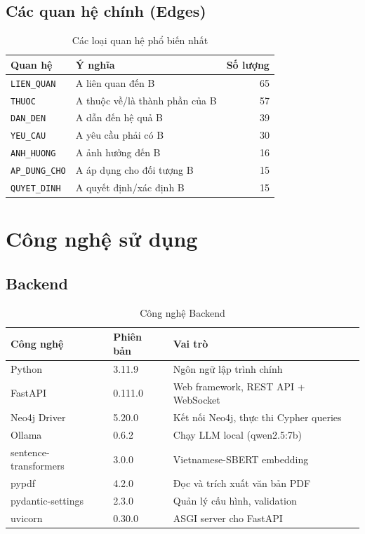 \documentclass[12pt,a4paper]{article}
\begin{document}
\subsection{Các quan hệ chính (Edges)}
\begin{table}[H]
\centering
\caption{Các loại quan hệ phổ biến nhất}
\begin{tabular}{llr}
\toprule
\textbf{Quan hệ} & \textbf{Ý nghĩa} & \textbf{Số lượng} \\
\midrule
\texttt{LIEN\_QUAN} & A liên quan đến B & 65 \\
\texttt{THUOC} & A thuộc về/là thành phần của B & 57 \\
\texttt{DAN\_DEN} & A dẫn đến hệ quả B & 39 \\
\texttt{YEU\_CAU} & A yêu cầu phải có B & 30 \\
\texttt{ANH\_HUONG} & A ảnh hưởng đến B & 16 \\
\texttt{AP\_DUNG\_CHO} & A áp dụng cho đối tượng B & 15 \\
\texttt{QUYET\_DINH} & A quyết định/xác định B & 15 \\
\bottomrule
\end{tabular}
\end{table}

\section{Công nghệ sử dụng}
\subsection{Backend}
\begin{table}[H]
\centering
\caption{Công nghệ Backend}
\begin{tabularx}{\textwidth}{llX}
\toprule
\textbf{Công nghệ} & \textbf{Phiên bản} & \textbf{Vai trò} \\
\midrule
Python & 3.11.9 & Ngôn ngữ lập trình chính \\
FastAPI & 0.111.0 & Web framework, REST API + WebSocket \\
Neo4j Driver & 5.20.0 & Kết nối Neo4j, thực thi Cypher queries \\
Ollama & 0.6.2 & Chạy LLM local (qwen2.5:7b) \\
sentence-transformers & 3.0.0 & Vietnamese-SBERT embedding \\
pypdf & 4.2.0 & Đọc và trích xuất văn bản PDF \\
pydantic-settings & 2.3.0 & Quản lý cấu hình, validation \\
uvicorn & 0.30.0 & ASGI server cho FastAPI \\
\bottomrule
\end{tabularx}
\end{table}
\end{document}
